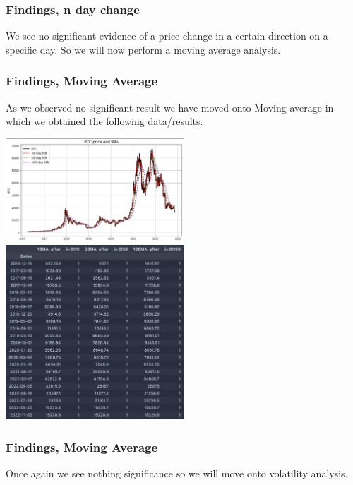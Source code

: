 \documentclass{beamer}
\begin{document}
\begin{frame}
    \frametitle{Findings, n day change}
We see no significant evidence of a price change in a certain direction on a specific day. So we will now perform a moving average analysis.
\end{frame}

\begin{frame}
    \frametitle{Findings, Moving Average}
As we observed no significant result we have moved onto Moving average in which we obtained the following data/results.
\begin{center}
  \includegraphics[width=0.5\textwidth]{research_project/text/paper/2.png}
\includegraphics[width=0.5\textwidth]{research_project/text/paper/3.png}  
\end{center}
\end{frame}

\begin{frame}
    \frametitle{Findings, Moving Average}
Once again we see nothing significance so we will move onto volatility analysis.
\end{frame}
\end{document}
